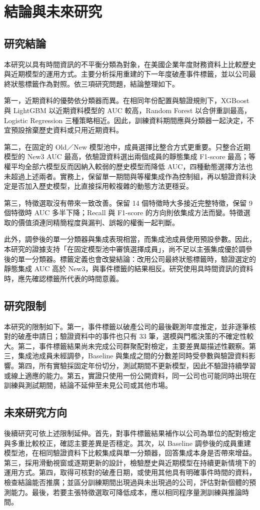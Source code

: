 \chapter{結論與未來研究}\label{chap:conclusion}
\begingroup
\setlength{\emergencystretch}{2em}

\section{研究結論}

本研究以具有時間資訊的不平衡分類為對象，在美國企業年度財務資料上比較歷史與近期模型的運用方式。主要分析採用重建的下一年度破產事件標籤，並以公司最終狀態標籤作為對照。依三項研究問題，結論整理如下。

第一，近期資料的優勢依分類器而異。在相同年份配置與驗證規則下，XGBoost 與 LightGBM 以近期資料模型的 AUC 較高，Random Forest 以合併重訓最高，Logistic Regression 三種策略相近。因此，訓練資料期間應與分類器一起決定，不宜預設捨棄歷史資料或只用近期資料。

第二，在固定的 Old／New 模型池中，成員選擇比整合方式更重要。只整合近期模型的 New3 AUC 最高，依驗證資料選出兩個成員的靜態集成 F1-score 最高；等權平均全部六模型反而因納入較弱的歷史模型而降低 AUC，四種動態選擇方法也未超過上述兩者。實務上，保留單一期間與等權集成作為控制組，再以驗證資料決定是否加入歷史模型，比直接採用較複雜的動態方法更穩妥。

第三，特徵選取沒有帶來一致改善。保留 14 個特徵時大多接近完整特徵，保留 9 個特徵時 AUC 多半下降；Recall 與 F1-score 的方向則依集成方法而變。特徵選取的價值須連同精簡程度與漏判、誤報的權衡一起判斷。

此外，調參後的單一分類器與集成表現相當，而集成池成員使用預設參數。因此，本研究的證據支持「在固定模型池中審慎選擇成員」，尚不足以主張集成優於調參後的單一分類器。標籤定義也會改變結論：改用公司最終狀態標籤時，驗證選定的靜態集成 AUC 高於 New3，與事件標籤的結果相反。研究使用具時間資訊的資料時，應先確認標籤所代表的時間意義。

\section{研究限制}

本研究的限制如下。第一，事件標籤以破產公司的最後觀測年度推定，並非逐筆核對的破產申請日；驗證資料中的事件也只有 33 筆，選模與門檻決策的不確定性較大。第二，事件標籤結果尚未完成公司群聚配對檢定，主要差異屬描述性觀察。第三，集成池成員未經調參，Baseline 與集成之間的分數差同時受參數與驗證資料影響。第四，所有實驗採固定年份切分，測試期間不更新模型，因此不驗證持續學習或線上適應的能力。第五，實證只使用一份公開資料，同一公司也可能同時出現在訓練與測試期間，結論不延伸至未見公司或其他市場。

\section{未來研究方向}

後續研究可依上述限制延伸。首先，對事件標籤結果補作以公司為單位的配對檢定與多重比較校正，確認主要差異是否穩定。其次，以 Baseline 調參後的成員重建模型池，在相同驗證資料下比較集成與單一分類器，回答集成本身是否帶來增益。第三，採用滑動視窗或逐期更新的設計，檢驗歷史與近期模型在持續更新情境下的運用方式。第四，取得可核對的破產日期，或使用其他具有明確事件時間的資料，檢查結論能否推廣；並區分訓練期間出現過與未出現過的公司，評估對新個體的預測能力。最後，若要主張特徵選取可降低成本，應以相同程序量測訓練與推論時間。
\endgroup
